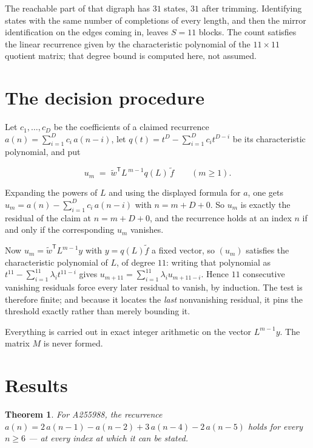 \documentclass[11pt]{article}
\newtheorem{theorem}{Theorem}
\theoremstyle{definition}
\begin{document}
The reachable part of that digraph has $31$ states, $31$ after trimming. Identifying states with the same number of completions of every length, and then the mirror identification on the edges coming in, leaves $S = 11$ blocks. The count satisfies the linear recurrence given by the characteristic polynomial of the $11\times11$ quotient matrix; that degree bound is computed here, not assumed.

\section{The decision procedure}

Let $c_1,\dots,c_D$ be the coefficients of a claimed recurrence $a(n) = \sum_{i=1}^{D} c_i\,a(n-i)$, let $q(t) = t^{D} - \sum_{i=1}^{D} c_i t^{D-i}$ be its characteristic polynomial, and put

\[u_m \;=\; \tilde w^{\mathsf T} L^{\,m-1} q(L)\,\tilde f \qquad (m \ge 1).\]

Expanding the powers of $L$ and using the displayed formula for $a$, one gets $u_m = a(n) - \sum_{i=1}^{D} c_i\,a(n-i)$ with $n = m + D + 0$. So $u_m$ is exactly the residual of the claim at $n = m + D + 0$, and the recurrence holds at an index $n$ if and only if the corresponding $u_m$ vanishes.

Now $u_m = \tilde w^{\mathsf T} L^{m-1} y$ with $y = q(L)\tilde f$ a fixed vector, so $(u_m)$ satisfies the characteristic polynomial of $L$, of degree $11$: writing that polynomial as $t^{11} - \sum_{i=1}^{11} \lambda_i t^{11-i}$ gives $u_{m+11} = \sum_{i=1}^{11} \lambda_i u_{m+11-i}$. Hence $11$ consecutive vanishing residuals force every later residual to vanish, by induction. The test is therefore finite; and because it locates the {\itshape last} nonvanishing residual, it pins the threshold exactly rather than merely bounding it.

Everything is carried out in exact integer arithmetic on the vector $L^{m-1}y$. The matrix $M$ is never formed.

\section{Results}

\begin{theorem} For A255988, the recurrence $a(n) = 2\,a(n-1) - a(n-2) + 3\,a(n-4) - 2\,a(n-5)$ holds for every $n \ge 6$ --- at every index at which it can be stated.\end{theorem}
\end{document}
